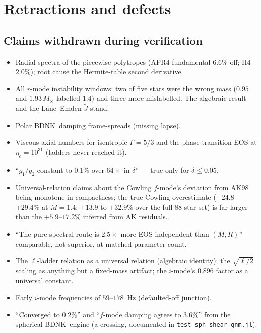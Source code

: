 \documentclass[aps,prd,preprint,amsmath,amssymb,nofootinbib,longbibliography]{revtex4-2}
\newcommand{\Msun}{M_\odot}
\newcommand{\BDNK}{BDNK}
\begin{document}
\section{Retractions and defects}

\subsection{Claims withdrawn during verification}
\begin{itemize}
\item Radial spectra of the piecewise polytropes (APR4 fundamental $6.6\%$ off; H4 $2.0\%$);
root cause the Hermite-table second derivative.
\item All $r$-mode instability windows: two of five stars were the wrong mass ($0.95$ and
$1.93\,\Msun$ labelled $1.4$) and three more mislabelled. The algebraic result and the
Lane--Emden $\tilde J$ stand.
\item Polar \BDNK\ damping frame-spreads (missing lapse).
\item Viscous axial numbers for isentropic $\Gamma=5/3$ and the phase-transition EOS at
$\eta_c=10^{31}$ (ladders never reached it).
\item ``$g_1/g_2$ constant to $0.1\%$ over $64\times$ in $\delta$'' --- true only for $\delta\le0.05$.
\item Universal-relation claims about the Cowling $f$-mode's deviation from AK98 being
monotone in compactness; the true Cowling overestimate ($+24.8$--$+29.4\%$ at $M=1.4$; $+13.9$ to
$+32.9\%$ over the full 88-star set) is far larger than the $+5.9$--$17.2\%$ inferred from AK
residuals.
\item ``The pure-spectral route is $2.5\times$ more EOS-independent than $(M,R)$'' --- comparable,
not superior, at matched parameter count.
\item The $\ell$-ladder relation as a universal relation (algebraic identity); the $\sqrt{\ell/2}$
scaling as anything but a fixed-mass artifact; the $i$-mode's $0.896$ factor as a universal
constant.
\item Early $i$-mode frequencies of $59$--$178$~Hz (defaulted-off junction).
\item ``Converged to $0.2\%$'' and ``$f$-mode damping agrees to $3.6\%$'' from the spherical
\BDNK\ engine (a crossing, documented in \texttt{test\_sph\_shear\_qnm.jl}).
\end{itemize}
\end{document}
